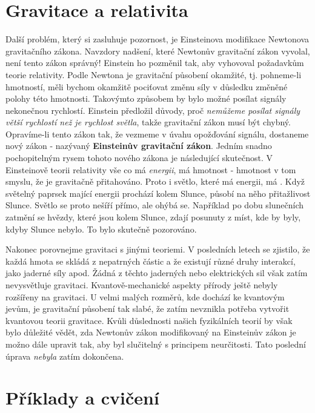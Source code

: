 {    
    
  \section{Gravitace a relativita}
    Další problém, který si zasluhuje pozornost, je Einsteinova modifikace Newtonova gravitačního 
    zákona. Navzdory nadšení, které Newtonův gravitační zákon vyvolal, není tento zákon správný! 
    Einstein ho pozměnil tak, aby vyhovoval požadavkům teorie relativity. Podle Newtona je 
    gravitační působení okamžité, tj. pohneme-li hmotností, měli bychom okamžitě pociťovat změnu 
    síly v důsledku změněné polohy této hmotnosti. Takovýmto způsobem by bylo možné posílat signály 
    nekonečnou rychlostí. Einstein předložil důvody, proč \emph{nemůžeme posílat signály větší 
    rychlostí než je rychlost světla}, takže gravitační zákon musí být chybný. Opravíme-li tento 
    zákon tak, že vezmeme v úvahu opožďování signálu, dostaneme nový zákon - nazývaný 
    \textbf{Einsteinův gravitační zákon}. Jedním snadno pochopitelným rysem tohoto nového zákona je 
    následující skutečnost. V Einsteinově teorii relativity vše co má \emph{energii}, má hmotnost - 
    hmotnost v tom smyslu, že je gravitačně přitahováno. Proto i světlo, které má energii, má 
    . Když světelný paprsek mající energii prochází kolem Slunce, působí na něho 
    přitažlivost Slunce. Světlo se proto nešíří přímo, ale ohýbá se. Například po dobu slunečních 
    zatmění se hvězdy, které jsou kolem Slunce, zdají posunuty z míst, kde by byly, kdyby Slunce 
    nebylo. To bylo skutečně pozorováno.
    
    Nakonec porovnejme gravitaci s jinými teoriemi. V posledních letech se zjistilo, že každá hmota 
    se skládá z nepatrných částic a že existují různé druhy interakcí, jako jaderné síly apod. 
    Žádná z těchto jaderných nebo elektrických sil však zatím nevysvětluje gravitaci.     
    Kvantově-mechanické aspekty přírody ještě nebyly rozšířeny na gravitaci. U velmi malých 
    rozměrů, kde dochází ke kvantovým jevům, je gravitační působení tak slabé, že zatím nevznikla 
    potřeba vytvořit kvantovou teorii gravitace. Kvůli důslednosti našich fyzikálních teorií by 
    však bylo důležité vědět, zda Newtonův zákon modifikovaný na Einsteinův zákon je možno dále 
    upravit tak, aby byl slučitelný s principem neurčitosti. Tato poslední úprava \emph{nebyla} 
    zatím dokončena.
  
  \section{Příklady a cvičení}

} %
\printbibliography[heading=subbibliography]
